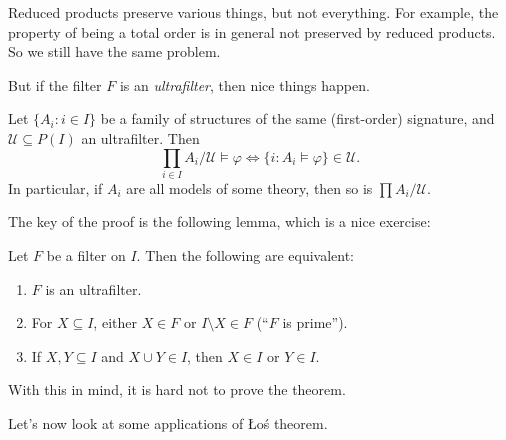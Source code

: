 \documentclass[a4paper]{article}
\begin{document}
Reduced products preserve various things, but not everything. For example, the property of being a total order is in general not preserved by reduced products. So we still have the same problem.

But if the filter $F$ is an \emph{ultrafilter}, then nice things happen.

\begin{thm}[\L{}o\'s theorem]
  Let $\{A_i: i \in I\}$ be a family of structures of the same (first-order) signature, and $\mathcal{U} \subseteq P(I)$ an ultrafilter. Then
  \[
    \prod_{i \in I} A_i/\mathcal{U} \vDash \varphi \Longleftrightarrow \{i: A_i \vDash \varphi\} \in \mathcal{U}.
  \]
  In particular, if $A_i$ are all models of some theory, then so is $\prod A_i / \mathcal{U}$.
\end{thm}

The key of the proof is the following lemma, which is a nice exercise:
\begin{lemma}
  Let $F$ be a filter on $I$. Then the following are equivalent:
  \begin{enumerate}
    \item $F$ is an ultrafilter.
    \item For $X \subseteq I$, either $X \in F$ or $I\setminus X \in F$ (``$F$ is prime'').
    \item If $X, Y \subseteq I$ and $X \cup Y \in I$, then $X \in I$ or $Y \in I$.
  \end{enumerate}
\end{lemma}
With this in mind, it is hard not to prove the theorem.



%
Let's now look at some applications of \L{}o\'s theorem.
\end{document}
